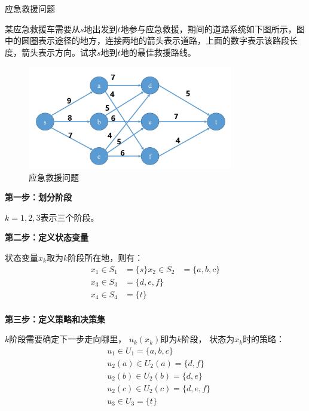 \begin{example}
    应急救援问题

    某应急救援车需要从$s$地出发到$t$地参与应急救援，期间的道路系统如下图所示，图中的圆圈表示途径的地方，连接两地的箭头表示道路，上面的数字表示该路段长度，箭头表示方向。试求$s$地到$t$地的最佳救援路线。

    \begin{figure}[ht]
        \centering
        \includegraphics[width=0.8\textwidth]{pic/1.2.1.png}
        \caption{应急救援问题}
    \end{figure}

    \textbf{第一步：划分阶段}

    $k=1, 2, 3$表示三个阶段。

    \textbf{第二步：定义状态变量}

    状态变量$x_k$取为$k$阶段所在地，则有：
    \begin{equation}
        \begin{aligned}
            x_1 \in S_1 & = \{s\}
            x_2 \in S_2 & = \{a,b,c\} \\
            x_3 \in S_3 & = \{d,e,f\} \\
            x_4 \in S_4 & = \{t\}     \\
        \end{aligned}
    \end{equation}

    \textbf{第三步：定义策略和决策集}

    $k$阶段需要确定下一步走向哪里， $u_k(x_k)$即为$k$阶段， 状态为$x_k$时的策略：
    \begin{equation}
        \begin{aligned}
             & u_1 \in U_1 = \{a,b,c\}       \\
             & u_2(a) \in U_2(a) = \{d,f\}   \\
             & u_2(b) \in U_2(b) = \{d,e\}   \\
             & u_2(c) \in U_2(c) = \{d,e,f\} \\
             & u_3 \in U_3 = \{t\}           \\
        \end{aligned}
    \end{equation}


\end{example}
